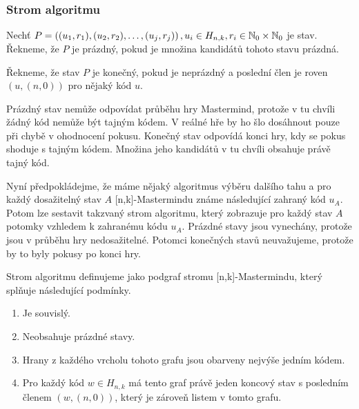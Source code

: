 \subsubsection{Strom algoritmu}

\begin{definice}\label{kandidat}
  Nechť $P = \left((u_1, r_1), (u_2,r_2), \dots, (u_j,r_j)\right), u_i \in H_{n,k}, r_i \in \mathbb{N} _0 \times \mathbb{N} _0$ je stav. Řekneme, že $P$ je prázdný, pokud je množina kandidátů tohoto stavu prázdná. 

  Řekneme, že stav $P$ je konečný, pokud je neprázdný a poslední člen je roven $(u,(n,0))$ pro nějaký kód $u$.
\end{definice}

Prázdný stav nemůže odpovídat průběhu hry Mastermind, protože v tu chvíli žádný kód nemůže být tajným kódem. V reálné hře by ho šlo dosáhnout pouze při chybě v ohodnocení pokusu. Konečný stav odpovídá konci hry, kdy se pokus shoduje s tajným kódem. Množina jeho kandidátů v tu chvíli obsahuje právě tajný kód. 




Nyní předpokládejme, že máme nějaký algoritmus výběru dalšího tahu a pro každý dosažitelný stav $A$ [n,k]-Mastermindu známe následující zahraný kód $u_A$. Potom lze sestavit takzvaný strom algoritmu, který zobrazuje pro každý stav $A$ potomky vzhledem k zahranému kódu $u_A$. Prázdné stavy jsou vynechány, protože jsou v průběhu hry nedosažitelné. Potomci konečných stavů neuvažujeme, protože by to byly pokusy po konci hry. 

\begin{definice}
  Strom algoritmu definujeme jako podgraf stromu [n,k]-Mastermindu, který splňuje následující podmínky.
  \begin{enumerate}
      \item Je souvislý.
      \item Neobsahuje prázdné stavy.
      \item Hrany z každého vrcholu tohoto grafu jsou obarveny nejvýše jedním kódem. 
      \item Pro každý kód $w \in H_{n,k}$ má tento graf právě jeden koncový stav s posledním členem $(w, (n,0))$, který je zároveň listem v tomto grafu.
  \end{enumerate}
\end{definice}

